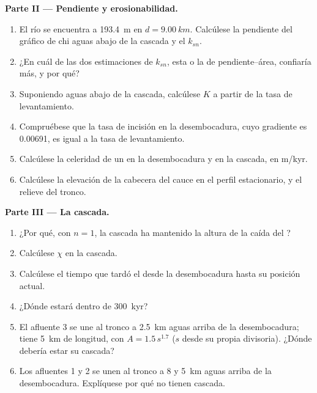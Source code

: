 \begin{problem}
\medskip\noindent\textbf{Parte II --- Pendiente y erosionabilidad.}
\begin{enumerate}[resume]
\item El río se encuentra a \qty{193.4}{m} en $d = \qty{9.00}{km}$. Calcúlese la
  pendiente del gráfico de chi aguas abajo de la cascada y el  $k_{sn}$.
\item ¿En cuál de las dos estimaciones de $k_{sn}$, esta o la de pendiente--área,
  confiaría más, y por qué?
\item Suponiendo  aguas abajo de la cascada, calcúlese $K$ a partir de la
  tasa de levantamiento.
\item Compruébese que la tasa de incisión en la desembocadura, cuyo gradiente es
  0.00691, es igual a la tasa de levantamiento.
\item Calcúlese la celeridad de un  en la desembocadura y en la
  cascada, en m/kyr.
\item Calcúlese la elevación de la cabecera del cauce en el perfil estacionario, y el
  relieve del tronco.
\end{enumerate}

\medskip\noindent\textbf{Parte III --- La cascada.}
\begin{enumerate}[resume]
\item ¿Por qué, con $n = 1$, la cascada ha mantenido la altura de la caída
  del ?
\item Calcúlese $\chi$ en la cascada.
\item Calcúlese el tiempo que tardó el  desde la
  desembocadura hasta su posición actual.
\item ¿Dónde estará dentro de \qty{300}{kyr}?
\item El afluente 3 se une al tronco a \qty{2.5}{km} aguas arriba de la desembocadura; tiene
  \qty{5}{km} de longitud, con $A = 1.5\,s^{1.7}$ ($s$ desde su propia divisoria).
  ¿Dónde debería estar su cascada?
\item Los afluentes 1 y 2 se unen al tronco a 8 y \qty{5}{km} aguas arriba de la
  desembocadura. Explíquese por qué no tienen cascada.
\end{enumerate}


\end{problem}
